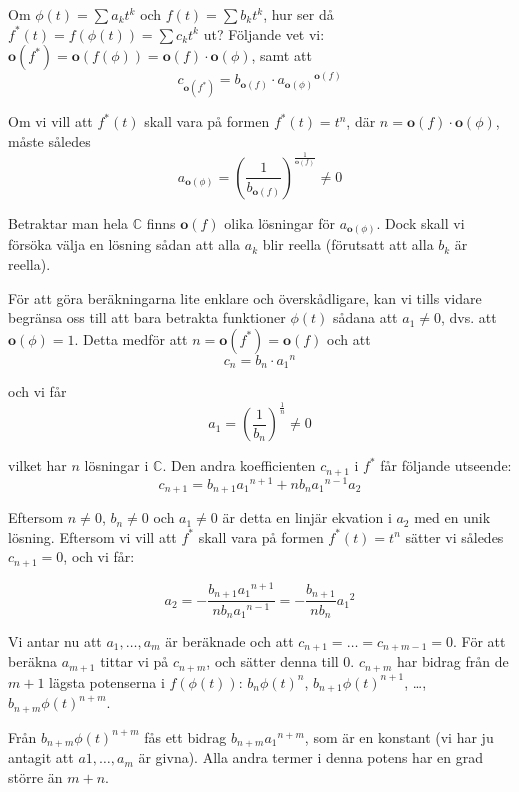 Om $\phi(t) = \sum a_k t^k$ och $f(t) = \sum b_k t^k$, hur ser då $f^*(t) = f(\phi(t)) = \sum c_k t^k$ ut? Följande vet vi: $\mathbf{o}(f^*) = \mathbf{o}(f(\phi)) = \mathbf{o}(f) \cdot \mathbf{o}(\phi)$, samt att \[c_{\mathbf{o}(f^*)}=b_{\mathbf{o}(f)} \cdot {a_{\mathbf{o}(\phi)}}^{\mathbf{o}(f)}\]

Om vi vill att $f^*(t)$ skall vara på formen $f^*(t) = t^n$, där $n = \mathbf{o}(f) \cdot \mathbf{o}(\phi)$, måste således \[a_{\mathbf{o}(\phi)} = \left(\frac{1}{b_{\mathbf{o}(f)}}\right)^\frac{1}{\mathbf{o}(f)} \neq 0\]

Betraktar man hela $\mathbb{C}$ finns $\mathbf{o}(f)$ olika lösningar för $a_{\mathbf{o}(\phi)}$. Dock skall vi försöka välja en lösning sådan att alla $a_k$ blir reella (förutsatt att alla $b_k$ är reella).

För att göra beräkningarna lite enklare och överskådligare, kan vi tills vidare begränsa oss till att bara betrakta funktioner $\phi(t)$ sådana att $a_1 \neq 0$, dvs. att $\mathbf{o}(\phi)=1$. Detta medför att $n = \mathbf{o}(f^*) = \mathbf{o}(f)$ och att 
\[c_n=b_n \cdot {a_1}^n\]

och vi får
\[a_1 = \left(\frac{1}{b_n}\right)^\frac{1}{n} \neq 0\]

vilket har $n$ lösningar i $\mathbb{C}$. Den andra koefficienten $c_{n+1}$ i $f^*$ får följande utseende:
\[c_{n+1} = b_{n+1} {a_1}^{n+1} + n b_n {a_1}^{n-1} a_2\]

Eftersom $n \neq 0$, $b_n \neq 0$ och $a_1 \neq 0$ är detta en linjär ekvation i $a_2$ med en unik lösning. Eftersom vi vill att $f^*$ skall vara på formen $f^*(t) = t^n$ sätter vi således $c_{n+1} = 0$, och vi får:

\[a_2 = -\frac{b_{n+1} {a_1}^{n+1}}{n b_n {a_1}^{n-1}}=-\frac{b_{n+1}}{n b_n} {a_1}^2\]

Vi antar nu att $a_1, \ldots, a_m$ är beräknade och att $c_{n+1} = \ldots = c_{n+m-1} = 0$. För att beräkna $a_{m+1}$ tittar vi på $c_{n+m}$, och sätter denna till $0$. $c_{n+m}$ har bidrag från de $m + 1$ lägsta potenserna i $f(\phi(t))$: $b_n\phi(t)^n$, $b_{n+1}\phi(t)^{n+1}$, \ldots, $b_{n+m}\phi(t)^{n+m}$.

Från $b_{n+m} \phi(t)^{n+m}$ fås ett bidrag $b_{n+m} {a_1}^{n+m}$, som är en konstant (vi har ju antagit att $a1,\ldots,a_m$ är givna). Alla andra termer i denna potens har en grad större än $m + n$.

